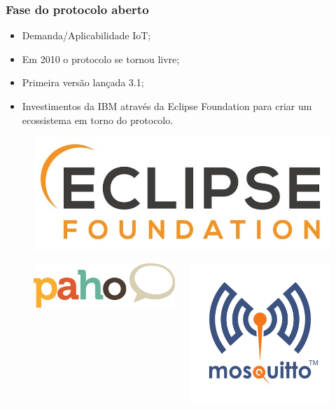 \documentclass[12pt]{beamer}
\begin{document}
\begin{frame}[allowframebreaks]
    \frametitle{Fase do protocolo aberto}
    \begin{itemize}
        \item Demanda/Aplicabilidade IoT;
        \item Em 2010 o protocolo se tornou livre;
        \item Primeira versão lançada 3.1;
        \item Investimentos da IBM através da Eclipse Foundation para criar um ecossistema em torno do protocolo.
    \end{itemize}
    \begin{figure}[!htb]
        \centering
        \includegraphics[width=.5\textwidth]{eclipse_logo}
    \end{figure}
    \framebreak
    \begin{figure}[!htb]
        \begin{columns}[c]
            \begin{column}{.5\textwidth}
                \includegraphics[width=.9\textwidth]{paho_logo}
            \end{column}
            \begin{column}{.5\textwidth}
                \includegraphics[width=.9\textwidth]{Mosquitto_logo}

\end{column}
\end{columns}
\end{figure}
\end{frame}
\end{document}
